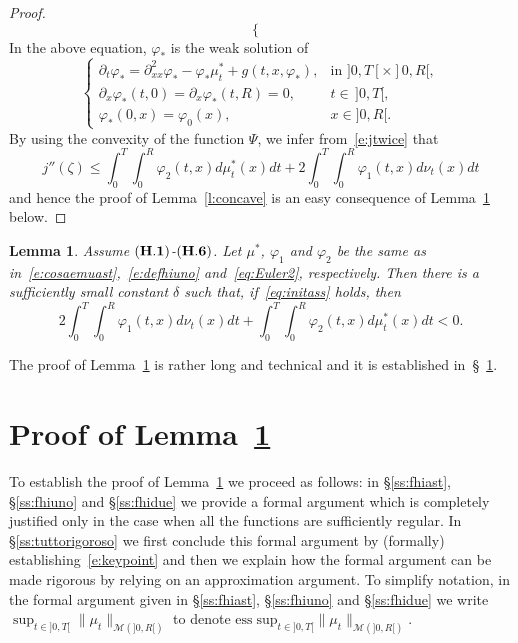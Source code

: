 \documentclass[11pt,leqno]{amsart}
\newtheorem{lemma}[theorem]{Lemma}
\numberwithin{equation}{section}
\begin{document}
\begin{proof}
\begin{equation}
\begin{cases}
\end{cases}
\end{equation}
In the above equation, ${\varphi}_\ast$ is the weak solution of
\begin{equation}
  \label{e:fhiast}
  \begin{cases}
    {\partial_t}{\varphi}_\ast = {\partial_{xx}^2}{\varphi}_\ast - {\varphi}_\ast \mu^\ast_t + g(t,x,{\varphi}_\ast),
    & \text{in $]0, T[ \times ]0, R[$},
    \\
      {\partial_x } {\varphi}_\ast(t,0)={\partial_x }{\varphi}_\ast(t,R) = 0, & t \in \, ]0, T[,
     \\
    {\varphi}_\ast(0,x)={\varphi}_0(x),
    & x\in{]0,R[}.
  \end{cases}
\end{equation}
By using the convexity of the function $\Psi$, we infer from~\eqref{e:jtwice} that 
\begin{equation*}
  j''(\zeta) \leq 
  \int_0^T\int_0^R {\varphi}_2(t,x) d  \mu_t^*(x)dt+
  2\int_0^T\int_0^R {\varphi}_1(t,x) d\nu_t(x)dt
\end{equation*}
and hence the proof of Lemma~\ref{l:concave} is an easy consequence of Lemma~\ref{l:uni1} below.
\end{proof}
\begin{lemma}
\label{l:uni1} Assume $\mathrm{{\bf (H.1)}}$-$\mathrm{{\bf (H.6)}}$.
Let $\mu^\ast$, ${\varphi}_1$ and ${\varphi}_2$ be the same as in~\eqref{e:cosaemuast},~\eqref{e:defhiuno} and~\eqref{eq:Euler2}, respectively.  Then  
 there is a sufficiently small constant $\delta$ such that, if~\eqref{eq:initass} holds, then 
\begin{equation}
\label{e:keypoint}
         2\int_0^T \! \! \int_0^R {\varphi}_1(t,x) d\nu_t(x)dt +
          \int_0^T \! \! \int_0^R {\varphi}_2(t,x) d\mu^\ast_t(x)dt< 0. 
\end{equation}
\end{lemma}
The proof of Lemma~\ref{l:uni1} is rather long and technical and it is established in~\S~\ref{s:pkey}. 
\section{Proof of Lemma~\ref{l:uni1}}
\label{s:pkey}
To establish the proof of Lemma~\ref{l:uni1} we proceed as follows: in \S\ref{ss:fhiast}, \S\ref{ss:fhiuno} and \S\ref{ss:fhidue} we provide a formal argument which is completely justified only in the case when all the functions are sufficiently regular. In \S\ref{ss:tuttorigoroso} we first conclude this formal argument by (formally) establishing~\eqref{e:keypoint}  and then we explain how the formal argument can be made rigorous by relying on an approximation argument. To simplify notation, in the formal argument given in \S\ref{ss:fhiast}, \S\ref{ss:fhiuno} and \S\ref{ss:fhidue} we write $\sup_{t \in ]0, T[} \| \mu_t \|_{\mathcal M(]0, R[)}$
to denote $\mathrm{ess \; sup}_{t \in ]0, T[} \| \mu_t \|_{\mathcal M(]0, R[)}$. 
\end{document}

